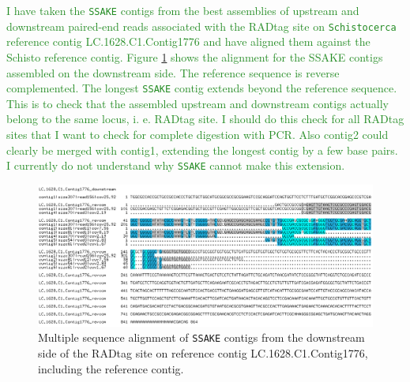 \documentclass{article}\usepackage[]{graphicx}\usepackage[]{color}
\newcommand{\roger}[1]{ \textcolor[named]{ForestGreen}{#1} }
\begin{document}
\roger{I have taken the \texttt{SSAKE} contigs from the best assemblies of upstream and downstream paired-end reads associated with the RADtag site on \texttt{Schistocerca} reference contig LC.1628.C1.Contig1776 and have aligned them against the Schisto reference contig. Figure \ref{SSAKE_contigs_aligned_against_Schisto_contig} shows the alignment for the SSAKE contigs assembled on the downstream side. The reference sequence is reverse complemented. The longest \texttt{SSAKE} contig extends beyond the reference sequence. This is to check that the assembled upstream and downstream contigs actually belong to the same locus, i. e. RADtag site. I should do this check for all RADtag sites that I want to check for complete digestion with PCR. Also contig2 could clearly be merged with contig1, extending the longest contig by a few base pairs. I currently do not understand why \texttt{SSAKE} cannot make this extension. }

\begin{figure}[htb!]
\centering
\includegraphics[width=\textwidth]{./figure/SSAKE_contigs_aligned_against_Schisto_contig}
\caption{Multiple sequence alignment of \texttt{SSAKE} contigs from the downstream side of the RADtag site on reference contig LC.1628.C1.Contig1776, including the reference contig.}
\label{SSAKE_contigs_aligned_against_Schisto_contig}
\end{figure}
\end{document}
